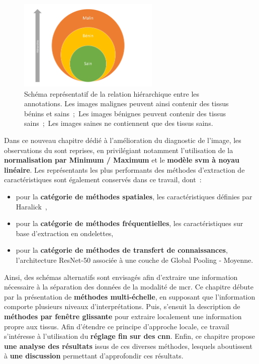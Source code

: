 \begin{figure}[H]
    \centering
    \includegraphics[width=0.6\textwidth]{contents/chapter_6/resources/scheme_image_improvement_annotations_hierarchy.pdf}
    \caption{Schéma représentatif de la relation hiérarchique entre les annotations. Les images malignes peuvent ainsi contenir des tissus bénins et sains~;~Les images bénignes peuvent contenir des tissus sains~;~Les images saines ne contiennent que des tissus sains.}
    \label{fig:scheme_image_improvement_annotations_hierarchy}
\end{figure}\par

Dans ce nouveau chapitre dédié à l'amélioration du diagnostic de l'image, les observations du  sont reprises, en privilégiant notamment l'utilisation de la \textbf{normalisation par Minimum / Maximum} et le \textbf{modèle \gls{svm} à noyau linéaire}. Les représentants les plus performants des méthodes d'extraction de caractéristiques sont également conservés dans ce travail, dont~:
\begin{itemize}
    \item pour la \textbf{catégorie de méthodes spatiales}, les caractéristiques définies par Haralick~,
    \item pour la \textbf{catégorie de méthodes fréquentielles}, les caractéristiques sur base d'extraction en ondelettes,
    \item pour la \textbf{catégorie de méthodes de transfert de connaissances}, l'architecture ResNet-50 associée à une couche de Global Pooling - Moyenne.
\end{itemize}\par

Ainsi, des schémas alternatifs sont envisagés afin d'extraire une information nécessaire à la séparation des données de la modalité de \gls{mcr}. Ce chapitre débute par la présentation de \textbf{méthodes multi-échelle}, en supposant que l'information comporte plusieurs niveaux d'interprétations. Puis, s'ensuit la description de \textbf{méthodes par fenêtre glissante} pour extraire localement une information propre aux tissus. Afin d'étendre ce principe d'approche locale, ce travail s'intéresse à l'utilisation du \textbf{réglage fin sur des \gls{cnn}}. Enfin, ce chapitre propose \textbf{une analyse des résultats} issus de ces diverses méthodes, lesquels aboutissent à \textbf{une discussion} permettant d'approfondir ces résultats.\par
\clearpage

